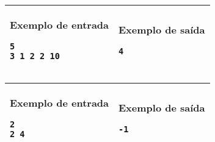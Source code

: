 \begin{table}[!h]
\centering
\begin{tabular}{|l|l|}
\hline
\begin{minipage}[t]{3in}
\textbf{Exemplo de entrada}
\begin{verbatim}
5
3 1 2 2 10
\end{verbatim}
\vspace{1mm}
\end{minipage}
&
\begin{minipage}[t]{3in}
\textbf{Exemplo de saída}
\begin{verbatim}
4
\end{verbatim}
\vspace{1mm}
\end{minipage} \\
\hline
\end{tabular}
\end{table}

\begin{table}[!h]
\centering
\begin{tabular}{|l|l|}
\hline
\begin{minipage}[t]{3in}
\textbf{Exemplo de entrada}
\begin{verbatim}
2
2 4
\end{verbatim}
\vspace{1mm}
\end{minipage}
&
\begin{minipage}[t]{3in}
\textbf{Exemplo de saída}
\begin{verbatim}
-1
\end{verbatim}
\vspace{1mm}
\end{minipage} \\
\hline
\end{tabular}
\end{table}
